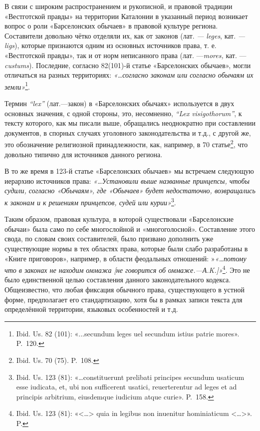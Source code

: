 В связи с широким распространением и рукописной, и правовой традиции «Вестготской правды» на территории Каталонии в указанный период возникает вопрос о роли «Барселонских обычаев» в правовой культуре региона. Составители довольно чётко отделяли их, как от законов (лат. \emph{--- }\emph{leges}, кат. \emph{--- }\emph{ligs}), которые признаются одним из основных источников права, т. е. «Вестготской правды», так и от норм неписанного права (лат. ---\emph{mores}\emph{, }кат. --- \emph{custums}). Последние, согласно 82(101)-й статье «Барселонских обычаев», могли отличаться на разных территориях: \emph{«…согласно законам или согласно обычаям их земли»}\footnote{Ibid. Us. 82 (101): «...secundum leges uel secundum istius patrie mores». P.~120.}.

Термин \emph{“}\emph{lex}\emph{” }(лат.---закон) в «Барселонских обычаях» используется в двух основных значения, с одной стороны, это, несомненно, \emph{“}\emph{Lex}\emph{ }\emph{visigothorum}\emph{”}, к тексту которого, как мы писали выше, обращались неоднократно при составлении документов, в спорных случаях уголовного законодательства и т.д., с другой же, это обозначение религиозной принадлежности, как, например, в 70 статье\footnote{Ibid. Us. 70 (75). P.~108.}, что довольно типично для источников данного региона.

В то же время в 123-й статье «Барселонских обычаев» мы встречаем следующую иерархию источников права: \emph{«…Установили выше названные принцепсы, чтобы судили, согласно «Обычаям», где «Обычаев» будет недостаточно, возвращались к законам и к решениям принцепсов, судей или курии»}\footnote{Ibid. Us. 123 (81): «…constituerunt prelibati principes secundum usaticum esse iudicata, et, ubi non sufficerent usatici, reuerterentur ad leges et ad principis arbitrium, eiusdemque iudicium atque curie». P.~158.}.

Таким образом, правовая культура, в которой существовали «Барселонские обычаи» была само по себе многослойной и «многоголосной». Составление этого свода, по словам своих составителей, было призвано дополнить уже существующие нормы в тех областях права, которые были слабо разработаны в «Книге приговоров», например, в области феодальных отношений: »\emph{«…потому что в законах не находим оммажа [не говорится об }\emph{оммаже.---}\emph{А.K.]»}\footnote{Ibid. Us. 123 (81):  «<…> quia in legibus non inuenitur hominiaticum <…>». P.}. Это не было единственной целью составления данного законодательного кодекса. Общеизвестно, что любая фиксация обычного права, существующего в устной форме, предполагает его стандартизацию, хотя бы в рамках записи текста для определённой территории, языковых особенностей и т.д.

